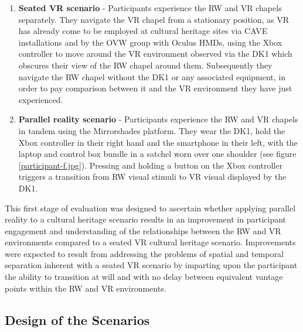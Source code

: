 \begin{enumerate}
	\item \textbf{Seated VR scenario} - Participants experience the RW and VR chapels separately. They navigate the VR chapel from a stationary position, as VR has already come to be employed at cultural heritage sites via CAVE installations and by the OVW group with Oculus HMDs, using the Xbox controller to move around the VR environment observed via the DK1 which obscures their view of the RW chapel around them. Subsequently they navigate the RW chapel without the DK1 or any associated equipment, in order to pay comparison between it and the VR environment they have just experienced.
	\item \textbf{Parallel reality scenario} - Participants experience the RW and VR chapels in tandem using the Mirrorshades platform. They wear the DK1, hold the Xbox controller in their right hand and the smartphone in their left, with the laptop and control box bundle in a satchel worn over one shoulder (see figure \ref{participant-f.jpg}). Pressing and holding a button on the Xbox controller triggers a transition from RW visual stimuli to VR visual displayed by the DK1.
\end{enumerate}

This first stage of evaluation was designed to ascertain whether applying parallel reality to a cultural heritage scenario results in an improvement in participant engagement and understanding of the relationships between the RW and VR environments compared to a seated VR cultural heritage scenario. Improvements were expected to result from addressing the problems of spatial and temporal separation inherent with a seated VR scenario by imparting upon the participant the ability to transition at will and with no delay between equivalent vantage points within the RW and VR environments.


\subsection{Design of the Scenarios}

